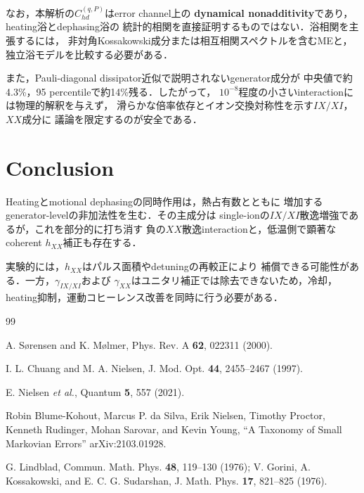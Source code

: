 \documentclass[dvipdfmx,a4paper,10pt,twocolumn]{jsarticle}
\begin{document}
なお，本解析の$C_{hd}^{(q,P)}$はerror channel上の
\textbf{dynamical nonadditivity}であり，heating浴とdephasing浴の
統計的相関を直接証明するものではない．浴相関を主張するには，
非対角Kossakowski成分または相互相関スペクトルを含むMEと，
独立浴モデルを比較する必要がある\cite{GKSL}．

また，Pauli-diagonal dissipator近似で説明されないgenerator成分が
中央値で約4.3\%，95 percentileで約14\%残る．したがって，
$10^{-8}$程度の小さいinteractionには物理的解釈を与えず，
滑らかな倍率依存とイオン交換対称性を示す$IX/XI$，$XX$成分に
議論を限定するのが安全である．

\section{Conclusion}

Heatingとmotional dephasingの同時作用は，熱占有数とともに
増加するgenerator-levelの非加法性を生む．その主成分は
single-ionの$IX/XI$散逸増強であるが，これを部分的に打ち消す
負の$XX$散逸interactionと，低温側で顕著なcoherent
$h_{XX}$補正も存在する．

実験的には，$h_{XX}$はパルス面積やdetuningの再較正により
補償できる可能性がある．一方，$\gamma_{IX/XI}$および
$\gamma_{XX}$はユニタリ補正では除去できないため，冷却，
heating抑制，運動コヒーレンス改善を同時に行う必要がある．

\begin{thebibliography}{99}
\small

A. S{\o}rensen and K. M{\o}lmer,
Phys. Rev. A \textbf{62}, 022311 (2000).

I. L. Chuang and M. A. Nielsen,
J. Mod. Opt. \textbf{44}, 2455--2467 (1997).

E. Nielsen \textit{et al.},
Quantum \textbf{5}, 557 (2021).

Robin Blume-Kohout, Marcus P. da Silva, Erik Nielsen,
Timothy Proctor, Kenneth Rudinger, Mohan Sarovar, and
Kevin Young, “A Taxonomy of Small Markovian Errors”
arXiv:2103.01928.

G. Lindblad,
Commun. Math. Phys. \textbf{48}, 119--130 (1976);
V. Gorini, A. Kossakowski, and E. C. G. Sudarshan,
J. Math. Phys. \textbf{17}, 821--825 (1976).

\end{thebibliography}
\end{document}

